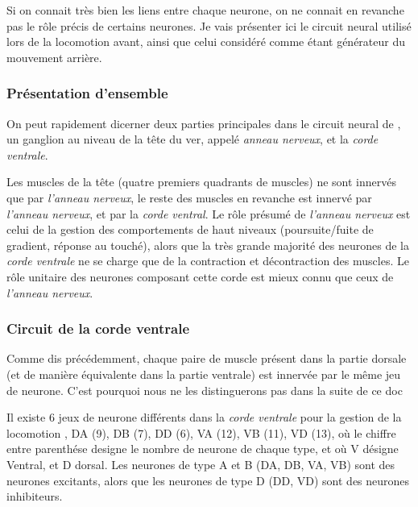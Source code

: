 Si on connait très bien les liens entre chaque neurone, on ne connait en
revanche pas le rôle précis de certains neurones. Je vais présenter ici le
circuit neural utilisé lors de la locomotion avant, ainsi que celui
considéré comme étant générateur du mouvement arrière.

\subsubsection{Présentation d'ensemble} %
\label{ssub:Présentation d'ensemble}

On peut rapidement dicerner deux parties principales dans le circuit neural de
\celeg{}, un ganglion au niveau de la tête du ver, appelé \textit{anneau
nerveux}, et la \textit{corde ventrale}.

Les muscles de la tête (quatre premiers quadrants de muscles) ne sont innervés que
par \textit{l'anneau nerveux}, le reste des muscles en revanche est innervé
par \textit{l'anneau nerveux}, et par la \textit{corde ventral}.  Le rôle
présumé de \textit{l'anneau nerveux} est celui de la gestion des comportements
de haut niveaux (poursuite/fuite de gradient, réponse au touché), alors que la
très grande majorité des neurones de la \textit{corde ventrale} ne se charge que
de la contraction et décontraction des muscles. Le rôle unitaire des neurones
composant cette corde est mieux connu que ceux de \textit{l'anneau nerveux}.


\subsubsection{Circuit de la corde ventrale} %
\label{ssub:Circuit de la corde ventrale}

Comme dis précédemment, chaque paire de muscle présent dans la partie dorsale
(et de manière équivalente dans la partie ventrale) est innervée par le même
jeu de neurone. C'est pourquoi nous ne les distinguerons pas dans la
suite de ce doc

Il existe 6 jeux de neurone différents dans la \textit{corde ventrale} pour la
gestion de la locomotion \cite{Boyle2009}, DA (9), DB (7), DD (6), VA (12), VB
(11), VD (13), où le chiffre entre parenthése designe le nombre de neurone de
chaque type, et où V désigne Ventral, et D dorsal.  Les neurones de type A et B
(DA, DB, VA, VB) sont des neurones excitants, alors que les neurones de type D
(DD, VD) sont des neurones inhibiteurs.\\


